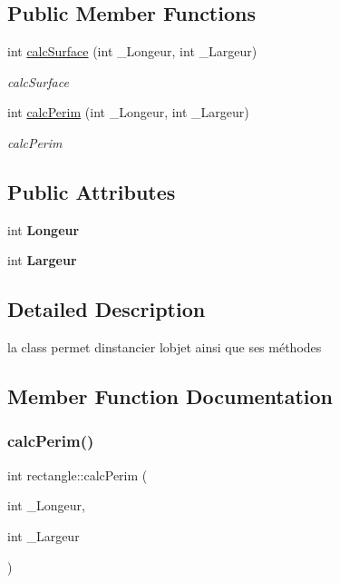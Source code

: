 \subsection*{Public Member Functions}
\begin{DoxyCompactItemize}
\item 
int \hyperlink{classrectangle_a26f1b435a0ef3f92dbad8c24a7d83d77}{calc\+Surface} (int \+\_\+\+Longeur, int \+\_\+\+Largeur)
\begin{DoxyCompactList}\small\item\em calc\+Surface \end{DoxyCompactList}\item 
int \hyperlink{classrectangle_adb98c249f2c6a0910013869c9b698b1a}{calc\+Perim} (int \+\_\+\+Longeur, int \+\_\+\+Largeur)
\begin{DoxyCompactList}\small\item\em calc\+Perim \end{DoxyCompactList}\end{DoxyCompactItemize}
\subsection*{Public Attributes}
\begin{DoxyCompactItemize}
\item 
\mbox{\label{classrectangle_aa08d37496ef07314559fb6b8e172a9c0}} 
int {\bfseries Longeur}
\item 
\mbox{\label{classrectangle_a207facc5dabb41085bfb74b73a12526d}} 
int {\bfseries Largeur}
\end{DoxyCompactItemize}


\subsection{Detailed Description}
la class permet d\textquotesingle{}instancier l\textquotesingle{}objet ainsi que ses méthodes 

\subsection{Member Function Documentation}
\mbox{\label{classrectangle_adb98c249f2c6a0910013869c9b698b1a}} 
\subsubsection{\texorpdfstring{calc\+Perim()}{calcPerim()}}
{\footnotesize\ttfamily int rectangle\+::calc\+Perim (\begin{DoxyParamCaption}\item[{int}]{\+\_\+\+Longeur,  }\item[{int}]{\+\_\+\+Largeur }\end{DoxyParamCaption})}



